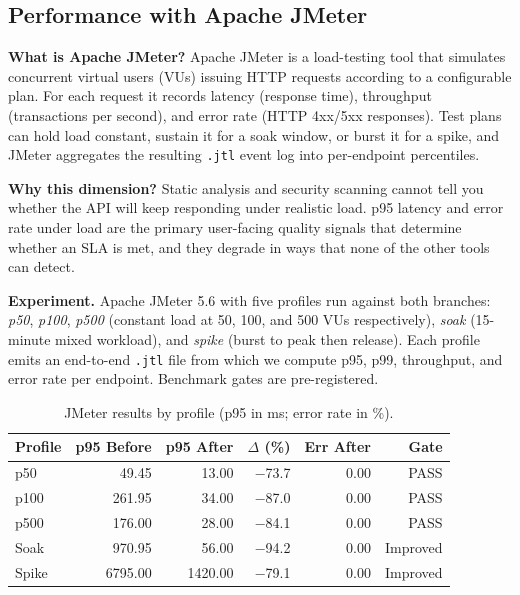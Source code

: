 \documentclass[conference]{IEEEtran}
\begin{document}
\subsection{Performance with Apache JMeter}\label{sec:jmeter}
\textbf{What is Apache JMeter?} Apache JMeter is a load-testing tool that simulates concurrent virtual users (VUs) issuing HTTP requests according to a configurable plan. For each request it records latency (response time), throughput (transactions per second), and error rate (HTTP 4xx/5xx responses). Test plans can hold load constant, sustain it for a soak window, or burst it for a spike, and JMeter aggregates the resulting \texttt{.jtl} event log into per-endpoint percentiles.

\textbf{Why this dimension?} Static analysis and security scanning cannot tell you whether the API will keep responding under realistic load. p95 latency and error rate under load are the primary user-facing quality signals that determine whether an SLA is met, and they degrade in ways that none of the other tools can detect.

\textbf{Experiment.} Apache JMeter 5.6 with five profiles run against both branches: \emph{p50}, \emph{p100}, \emph{p500} (constant load at 50, 100, and 500 VUs respectively), \emph{soak} (15-minute mixed workload), and \emph{spike} (burst to peak then release). Each profile emits an end-to-end \texttt{.jtl} file from which we compute p95, p99, throughput, and error rate per endpoint. Benchmark gates are pre-registered.

\begin{table}[t]
\caption{JMeter results by profile (p95 in ms; error rate in \%).}
\label{tab:jmeter}
\centering
\begin{tabular}{lrrrrr}
\toprule
Profile & p95 Before & p95 After & $\Delta$ (\%) & Err After & Gate \\
\midrule
p50    &    49.45 &   13.00 & $-$73.7 & 0.00 & PASS \\
p100   &   261.95 &   34.00 & $-$87.0 & 0.00 & PASS \\
p500   &   176.00 &   28.00 & $-$84.1 & 0.00 & PASS \\
Soak   &   970.95 &   56.00 & $-$94.2 & 0.00 & Improved\footnotemark[2] \\
Spike  &  6795.00 & 1420.00 & $-$79.1 & 0.00 & Improved\footnotemark[2] \\
\bottomrule
\end{tabular}
\end{table}
\end{document}
